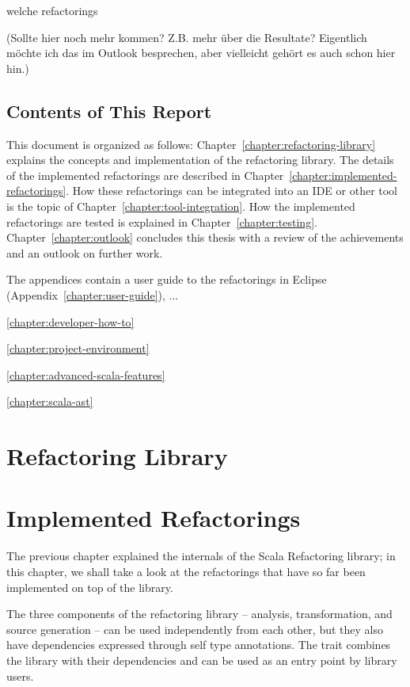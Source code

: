 \documentclass[10pt,a4paper,oneside]{scrreprt}
\begin{document}
welche refactorings

(Sollte hier noch mehr kommen? Z.B. mehr \"uber die Resultate? Eigentlich m\"ochte ich das im Outlook besprechen, aber vielleicht geh\"ort es auch schon hier hin.)

\section{Contents of This Report}

This document is organized as follows: Chapter~\vref{chapter:refactoring-library} explains the concepts and implementation of the refactoring library. The details of the implemented refactorings are described in Chapter~\vref{chapter:implemented-refactorings}. How these refactorings can be integrated into an IDE or other tool is the topic of Chapter~\vref{chapter:tool-integration}. How the implemented refactorings are tested is explained in Chapter~\vref{chapter:testing}. Chapter~\vref{chapter:outlook} concludes this thesis with a review of the achievements and an outlook on further work.

The appendices contain a user guide to the refactorings in Eclipse (Appendix~\vref{chapter:user-guide}), ...


\vref{chapter:developer-how-to}

\vref{chapter:project-environment}

\vref{chapter:advanced-scala-features}

\vref{chapter:scala-ast}

\chapter{Refactoring Library} \label{chapter:refactoring-library}



\chapter{Implemented Refactorings} \label{chapter:implemented-refactorings}

The previous chapter explained the internals of the Scala Refactoring library; in this chapter, we shall take a look at the refactorings that have so far been implemented on top of the library. 

The three components of the refactoring library -- analysis, transformation, and source generation -- can be used independently from each other, but they also have dependencies expressed through self type annotations. The  trait combines the library with their dependencies and can be used as an entry point by library users.
\end{document}
